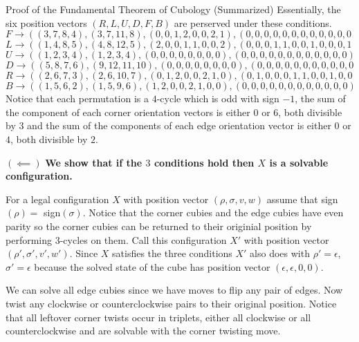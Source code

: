 \documentclass[final]{beamer}
\newlength{\colwidth}
\begin{document}
\begin{frame}[t]
\begin{columns}[t]
\begin{column}{\colwidth}
\begin{block}{Proof of the Fundamental Theorem of Cubology (Summarized)}
Essentially, the six position vectors $(R,L,U,D,F,B)$ are perserved under these conditions.
$$F \rightarrow ((3, 7, 8, 4), (3, 7, 11, 8), (0, 0, 1, 2, 0, 0, 2, 1), (0, 0, 0, 0, 0, 0, 0, 0, 0, 0, 0, 0))$$
$$L \rightarrow ((1 ,4,8,5),(4,8,12,5),(2, 0, 0, 1, 1, 0, 0, 2), (0, 0, 0, 1, 1, 0, 0, 1, 0, 0, 0, 1))$$
$$U \rightarrow ((1, 2, 3, 4), (1, 2, 3, 4), (0, 0, 0, 0, 0, 0, 0, 0), (0, 0, 0, 0, 0, 0, 0, 0, 0, 0, 0, 0))$$
$$D \rightarrow ((5, 8, 7, 6), (9, 12, 11, 10), (0, 0, 0, 0, 0, 0, 0, 0), (0, 0, 0, 0, 0, 0, 0, 0, 0, 0, 0, 0))$$
$$R \rightarrow ((2,6,7,3),(2,6,10,7),(0,1,2,0,0,2,1,0),(0,1,0,0,0,1,1,0,0,1,0,0))$$
$$B \rightarrow ((1, 5, 6, 2), (1, 5, 9, 6), (1, 2, 0, 0, 2, 1, 0, 0), (0, 0, 0, 0, 0, 0, 0, 0, 0, 0, 0, 0))$$
Notice that each permutation is a $4$-cycle which is odd with sign $-1$, the sum of the component of each corner orientation vectors is either $0$ or $6$, both divisible by $3$ and 
the sum of the components of each edge orientation vector is either $0$ or $4$, both divisible by $2$.

$(\impliedby)$ 
\textbf{We show that if the $3$ conditions hold then $X$ is a solvable configuration.}

For a legal configuration $X$ with position vector $(\rho, \sigma, v, w)$ assume that sign$(\rho)=$ sign$(\sigma)$.
Notice that the corner cubies and the edge cubies have even parity so the corner cubies can be returned to their originial position by performing $3$-cycles on them. 
Call this configuration $X'$ with position vector $(\rho', \sigma', v', w')$.
Since $X$ satisfies the three conditions $X'$ also does with $\rho' = \epsilon$, $\sigma' = \epsilon$ because the solved state of the cube has position vector $(\epsilon, \epsilon, 0 , 0)$.

We can solve all edge cubies since we have moves to flip any pair of edges.
Now twist any clockwise or counterclockwise pairs to their original position.
Notice that all leftover corner twists occur in triplets, either all clockwise or all counterclockwise and are solvable with the corner twisting move.


  \end{block}



\end{column}
\end{columns}
\end{frame}
\end{document}
